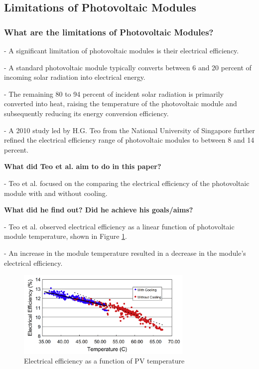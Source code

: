 \subsection{Limitations of Photovoltaic Modules}
\subsubsection{What are the limitations of Photovoltaic Modules?}
- A significant limitation of photovoltaic modules is their electrical efficiency.\par
\noindent- A standard photovoltaic module typically converts between 6 and 20 percent of incoming solar radiation into electrical energy.\par
\noindent - The remaining 80 to 94 percent of incident solar radiation is primarily converted into heat, raising the temperature of the photovoltaic module and subsequently reducing its energy conversion efficiency. \cite{Dubey2013TemperatureReview}\par\vspace{1em}

\noindent - A 2010 study led by H.G. Teo from the National University of Singapore further refined the electrical efficiency range of photovoltaic modules to between 8 and 14 percent.\par
\noindent \textbf{What did Teo et al. aim to do in this paper?}\par
\noindent - Teo et al. \cite{Teo2012AnModules} focused on the comparing the electrical efficiency of the photovoltaic module with and without cooling.\par
\noindent \textbf{What did he find out? Did he achieve his goals/aims?}\par
\noindent 
\noindent - Teo et al. \cite{Teo2012AnModules} observed electrical efficiency as a linear function of photovoltaic module temperature, shown in Figure \ref{fig:electrical_efficiency_vs_temperature_pv_module}.\par
\noindent - An increase in the module temperature resulted in a decrease in the module's electrical efficiency.\par

\begin{figure}[ht]
    \centering
    \includegraphics[width=0.75\textwidth]{Figures/electrical_efficiency_vs_temperature_pv_module.png}
    \caption{Electrical efficiency as a function of PV temperature \cite{Teo2012AnModules}}
    \label{fig:electrical_efficiency_vs_temperature_pv_module}
\end{figure}
\FloatBarrier

